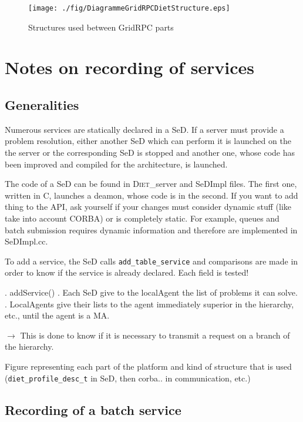\newpage

\pagestyle{plain}

\begin{figure}
\begin{center}
\texttt{[image: ./fig/DiagrammeGridRPCDietStructure.eps]}
\caption{Structures used between GridRPC parts}
\end{center}
\end{figure}

\section{Notes on recording of services}

\subsection{Generalities}

Numerous services are statically declared in a SeD. If a server must
provide a problem resolution, either another SeD which can perform it
is launched on the the server or the corresponding SeD is stopped and
another one, whose code has been improved and compiled for the
architecture, is launched.

The code of a SeD can be found in \textsc{Diet}\_server and SeDImpl
files. The first one, written in C, launches a deamon, whose code is
in the second. If you want to add thing to the API, ask yourself if
your changes must consider dynamic stuff (like take into account
CORBA) or is completely static. For example, queues and batch
submission requires dynamic information and therefore are implemented
in SeDImpl.cc.

To add a service, the SeD calls \verb$add_table_service$ and
comparisons are made in order to know if the service is already
declared. Each field is tested!

. addService()
. Each SeD give to the localAgent the list of problems it can solve.
. LocalAgents give their lists to the agent immediately superior in the hierarchy, etc., until the agent is a MA.

$\rightarrow$ This is done to know if it is necessary to transmit a
request on a branch of the hierarchy.

Figure representing each part of the platform and kind of structure
that is used (\verb$diet_profile_desc_t$ in SeD, then corba.. in
communication, etc.)

\subsection{Recording of a batch service}

